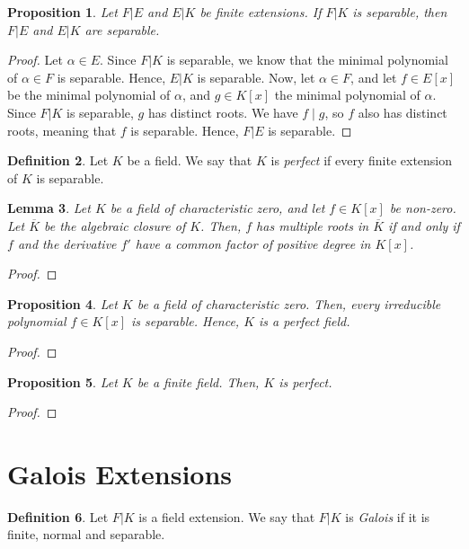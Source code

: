 \documentclass[a4paper, openany]{memoir}
\theoremstyle{definition}
\newtheorem{definition}{Definition}[section]
\theoremstyle{plain}
\newtheorem{lemma}[definition]{Lemma}
\newtheorem{proposition}[definition]{Proposition}
\begin{document}
    \begin{proposition}
        Let $F|E$ and $E|K$ be finite extensions. If $F|K$ is separable, then $F|E$ and $E|K$ are separable.
    \end{proposition}
    \begin{proof}
        Let $\alpha \in E$. Since $F|K$ is separable, we know that the minimal polynomial of $\alpha \in F$ is separable. Hence, $E|K$ is separable. Now, let $\alpha \in F$, and let $f \in E[x]$ be the minimal polynomial of $\alpha$, and $g \in K[x]$ the minimal polynomial of $\alpha$. Since $F|K$ is separable, $g$ has distinct roots. We have $f \mid g$, so $f$ also has distinct roots, meaning that $f$ is separable. Hence, $F|E$ is separable.
    \end{proof}

    \begin{definition}
        Let $K$ be a field. We say that $K$ is \emph{perfect} if every finite extension of $K$ is separable.
    \end{definition}

    \begin{lemma}
        Let $K$ be a field of characteristic zero, and let $f \in K[x]$ be non-zero. Let $\overline{K}$ be the algebraic closure of $K$. Then, $f$ has multiple roots in $\overline{K}$ if and only if $f$ and the derivative $f'$ have a common factor of positive degree in $K[x]$.
    \end{lemma}
    \begin{proof}
        
    \end{proof}

    \begin{proposition}
        Let $K$ be a field of characteristic zero. Then, every irreducible polynomial $f \in K[x]$ is separable. Hence, $K$ is a perfect field.
    \end{proposition}
    \begin{proof}
        
    \end{proof}

    \begin{proposition}
        Let $K$ be a finite field. Then, $K$ is perfect.
    \end{proposition}
    \begin{proof}
        
    \end{proof}
    \newpage

    \section{Galois Extensions}
    \begin{definition}
        Let $F|K$ is a field extension. We say that $F|K$ is \emph{Galois} if it is finite, normal and separable.
    \end{definition}
\end{document}
